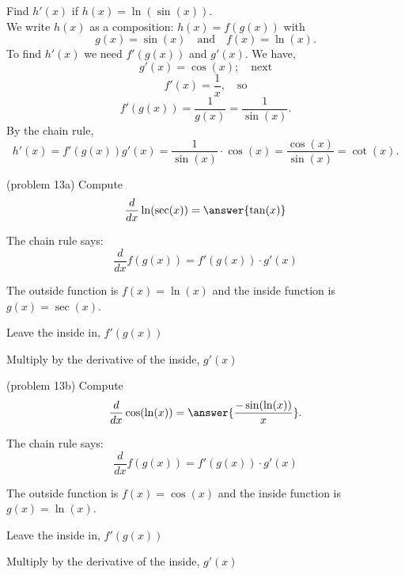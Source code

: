 \documentclass[handout]{ximera}
\begin{document}
\begin{example}[example 13]
Find $h'(x)$ if $h(x) = \ln(\sin(x))$.\\
We write $h(x)$ as a composition: $h(x)=f(g(x))$ with 
\[g(x) = \sin(x)  \quad \text{and} \quad  f(x) = \ln(x).\]
 To find $h'(x)$ we need $f'(g(x))$ and $g'(x)$.  We have,
\[g'(x) = \cos(x); \quad \text{next} \]
\[f'(x) = \frac{1}{x}, \quad \text{so}\]
\[f'(g(x)) = \frac{1}{g(x)} = \frac{1}{\sin(x)}.\]
By the chain rule,
\[h'(x) = f'(g(x))g'(x) = \frac{1}{\sin(x)} \cdot \cos(x) = \frac{\cos(x)}{\sin(x)} = \cot(x).\]
\end{example}

\begin{center}
\begin{foldable}
\end{foldable}
\end{center}


\begin{problem}(problem 13a)
  Compute
  \[
  \frac{d}{dx} \ln(\sec(x)) = \answer{\tan(x)}
  \]
  
    \begin{hint}
      The chain rule says:
      \[
      \frac{d}{dx} f(g(x)) = f'(g(x))\cdot g'(x)
      \]
    \end{hint}
    \begin{hint}
      The outside function is $f(x) = \ln(x)$ and the inside
      function is $g(x) = \sec(x)$.
    \end{hint}
    \begin{hint}
		  Leave the inside in, $f'(g(x))$
		\end{hint}
		\begin{hint}
		  Multiply by the derivative of the inside, $g'(x)$
		\end{hint}
    
	
\end{problem}

\begin{problem}(problem 13b)
  Compute
  \[
  \frac{d}{dx} \cos(\ln(x)) = \answer{\frac{-\sin(\ln(x))}{x}}.
  \]
  
    \begin{hint}
      The chain rule says:
      \[
      \frac{d}{dx} f(g(x)) = f'(g(x))\cdot g'(x)
      \]
    \end{hint}
    \begin{hint}
      The outside function is $f(x) = \cos(x)$ and the inside
      function is $g(x) = \ln(x)$.
    \end{hint}
    \begin{hint}
		  Leave the inside in, $f'(g(x))$
		\end{hint}
		\begin{hint}
		  Multiply by the derivative of the inside, $g'(x)$
		\end{hint}
    
		
\end{problem}
\end{document}
